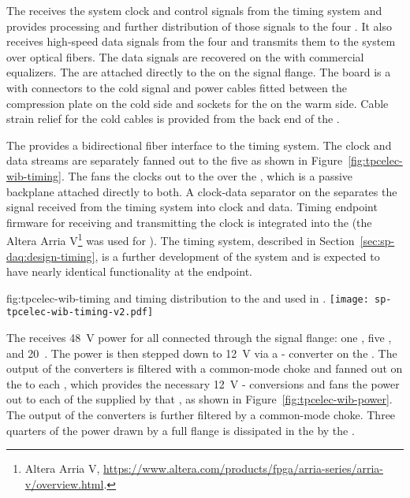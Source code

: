 The  
receives the system clock and control signals from the
timing system and provides processing and further distribution of those signals to the four
. 
It also receives high-speed data signals from the four 
 and transmits them to the  system over optical
fibers. The data signals are recovered on the  with commercial 
equalizers. The  are attached directly to the 
 \fdth on the signal flange. The \fdth board is a  
with connectors to the cold signal and  power cables fitted
between the compression plate on the cold side and sockets for
the  on the warm side. Cable strain relief for the cold cables is 
provided from the back end of the \fdth.

The   provides a bidirectional fiber interface to the
timing system. The clock and data streams are separately fanned out to the 
five  as shown in Figure~\ref{fig:tpcelec-wib-timing}. The 
 fans the clocks out to the  over the , which is a 
passive backplane attached directly to both. A clock-data separator on the 
 separates the signal received from the timing system into clock and data. 
Timing endpoint firmware for receiving and transmitting 
the clock is integrated into the   (the Altera 
Arria V\footnote{Altera Arria\texttrademark{} V, 
\url{https://www.altera.com/products/fpga/arria-series/arria-v/overview.html}.} was used for ). 
The  timing system, described in Section~\ref{sec:sp-daq:design-timing}, 
is a further development of the  system and is expected to have nearly identical 
functionality at the  endpoint.

\begin{dunefigure}
{fig:tpcelec-wib-timing}
{ and timing distribution to the  and  used in .}
\texttt{[image: sp-tpcelec-wib-timing-v2.pdf]}
\end{dunefigure}

The  %
receives \SI{48}{V}  power for all  %
connected through the  signal flange: 
one , five , and \num{20}~. 
The  power is then stepped down to \SI{12}{V} via 
a - converter on the . The output 
of the  converters is filtered with a common-mode choke 
and fanned out on the  to each , which provides the 
necessary \SI{12}{V} - conversions and fans
the  power out to each of the   supplied 
by that , as shown in Figure~\ref{fig:tpcelec-wib-power}. 
The output of the  converters is further filtered by a 
common-mode choke. Three quarters of the power drawn by a full flange is 
dissipated in the  by the .

